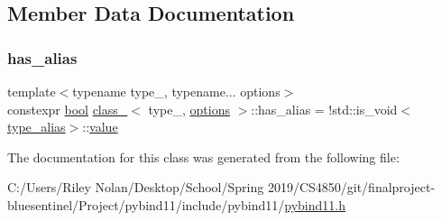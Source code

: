 \subsection{Member Data Documentation}
\mbox{\label{classclass___ad98ce9926c534c9e8859a144f50d2b59}} 
\subsubsection{\texorpdfstring{has\_alias}{has\_alias}}
{\footnotesize\ttfamily template$<$typename type\+\_\+, typename... options$>$ \\
constexpr \mbox{\hyperlink{asdl_8h_af6a258d8f3ee5206d682d799316314b1}{bool}} \mbox{\hyperlink{classclass__}{class\+\_\+}}$<$ type\+\_\+, \mbox{\hyperlink{classoptions}{options}} $>$\+::has\+\_\+alias = !std\+::is\+\_\+void$<$\mbox{\hyperlink{classclass___a18716f57a4db37eb2e5482309e5253c4}{type\+\_\+alias}}$>$\+::\mbox{\hyperlink{_s_d_l__opengl__glext_8h_a8ad81492d410ff2ac11f754f4042150f}{value}}\hspace{0.3cm}{\ttfamily [static]}}



The documentation for this class was generated from the following file\+:\begin{DoxyCompactItemize}
\item 
C\+:/\+Users/\+Riley Nolan/\+Desktop/\+School/\+Spring 2019/\+C\+S4850/git/finalproject-\/bluesentinel/\+Project/pybind11/include/pybind11/\mbox{\hyperlink{pybind11_8h}{pybind11.\+h}}\end{DoxyCompactItemize}
